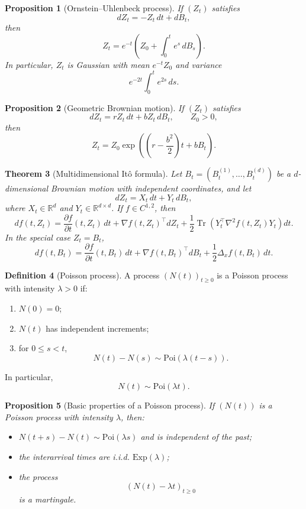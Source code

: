 \documentclass[11pt]{article}
\newtheorem{theorem}{Theorem}[section]
\newtheorem{proposition}[theorem]{Proposition}
\theoremstyle{definition}
\newtheorem{definition}[theorem]{Definition}
\begin{document}
\begin{proposition}[Ornstein--Uhlenbeck process]
If $(Z_t)$ satisfies
\[
dZ_t=-Z_t\,dt+dB_t,
\]
then
\[
Z_t=e^{-t}\left(Z_0+\int_0^t e^s\,dB_s\right).
\]
In particular, $Z_t$ is Gaussian with mean $e^{-t}Z_0$ and variance
\[
e^{-2t}\int_0^t e^{2s}\,ds.
\]
\end{proposition}

\begin{proposition}[Geometric Brownian motion]
If $(Z_t)$ satisfies
\[
dZ_t=rZ_t\,dt+bZ_t\,dB_t,
\qquad Z_0>0,
\]
then
\[
Z_t = Z_0\exp\left(\left(r-\frac{b^2}{2}\right)t+bB_t\right).
\]
\end{proposition}

\begin{theorem}[Multidimensional It\^o formula]
Let $B_t=(B_t^{(1)},\dots,B_t^{(d)})$ be a $d$-dimensional Brownian motion with independent coordinates, and let
\[
dZ_t = X_t\,dt + Y_t\,dB_t,
\]
where $X_t\in\mathbb R^d$ and $Y_t\in\mathbb R^{d\times d}$. If $f\in C^{1,2}$, then
\[
df(t,Z_t)
=
\frac{\partial f}{\partial t}(t,Z_t)\,dt
+
\nabla f(t,Z_t)^\top dZ_t
+
\frac12 \operatorname{Tr}\!\left(Y_t^\top \nabla^2 f(t,Z_t)Y_t\right)dt.
\]
In the special case $Z_t=B_t$,
\[
df(t,B_t)
=
\frac{\partial f}{\partial t}(t,B_t)\,dt
+
\nabla f(t,B_t)^\top dB_t
+
\frac12 \Delta_x f(t,B_t)\,dt.
\]
\end{theorem}

\begin{definition}[Poisson process]
A process $(N(t))_{t\ge 0}$ is a Poisson process with intensity $\lambda>0$ if:
\begin{enumerate}[label=(\roman*)]
    \item $N(0)=0$;
    \item $N(t)$ has independent increments;
    \item for $0\le s<t$,
    \[
    N(t)-N(s)\sim \mathrm{Poi}(\lambda(t-s)).
    \]
\end{enumerate}
In particular,
\[
N(t)\sim \mathrm{Poi}(\lambda t).
\]
\end{definition}

\begin{proposition}[Basic properties of a Poisson process]
If $(N(t))$ is a Poisson process with intensity $\lambda$, then:
\begin{itemize}[leftmargin=2em]
    \item $N(t+s)-N(t)\sim \mathrm{Poi}(\lambda s)$ and is independent of the past;
    \item the interarrival times are i.i.d. $\mathrm{Exp}(\lambda)$;
    \item the process
    \[
    (N(t)-\lambda t)_{t\ge 0}
    \]
    is a martingale.
\end{itemize}
\end{proposition}
\end{document}
